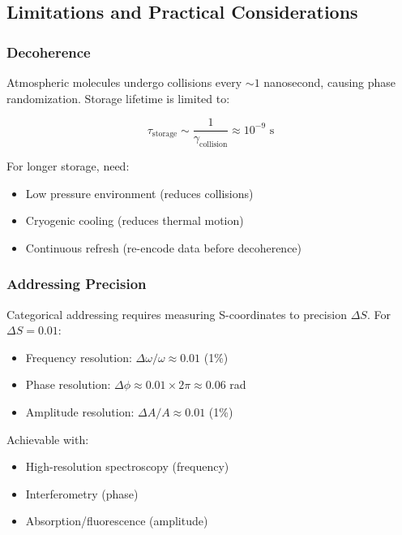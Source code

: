 \subsection{Limitations and Practical Considerations}

\subsubsection{Decoherence}

Atmospheric molecules undergo collisions every $\sim 1$ nanosecond, causing phase randomization. Storage lifetime is limited to:

\begin{equation}
\tau_{\text{storage}} \sim \frac{1}{\gamma_{\text{collision}}} \approx 10^{-9} \text{ s}
\end{equation}

For longer storage, need:
\begin{itemize}
\item Low pressure environment (reduces collisions)
\item Cryogenic cooling (reduces thermal motion)
\item Continuous refresh (re-encode data before decoherence)
\end{itemize}

\subsubsection{Addressing Precision}

Categorical addressing requires measuring S-coordinates to precision $\Delta S$. For $\Delta S = 0.01$:

\begin{itemize}
\item Frequency resolution: $\Delta \omega/\omega \approx 0.01$ (1\%)
\item Phase resolution: $\Delta \phi \approx 0.01 \times 2\pi \approx 0.06$ rad
\item Amplitude resolution: $\Delta A/A \approx 0.01$ (1\%)
\end{itemize}

Achievable with:
\begin{itemize}
\item High-resolution spectroscopy (frequency)
\item Interferometry (phase)
\item Absorption/fluorescence (amplitude)
\end{itemize}

